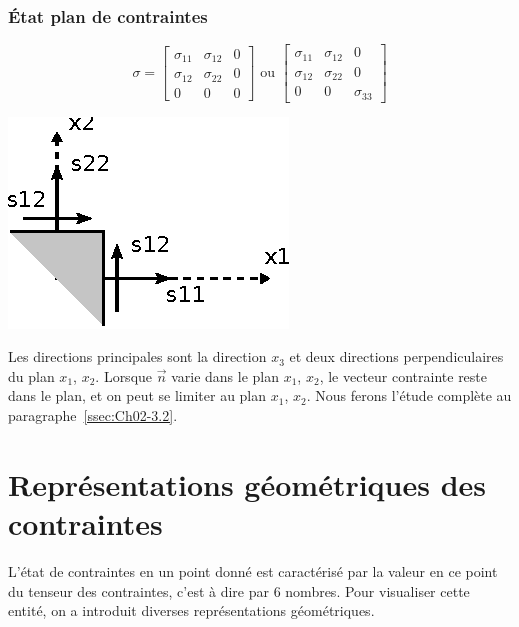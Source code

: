 \subsubsection{État plan de contraintes}
\begin{equation}
    \mathbb{\sigma} = 
    \begin{bmatrix}
        \sigma_{11} & \sigma_{12} & 0 \\
        \sigma_{12} & \sigma_{22} & 0 \\
        0 & 0 & 0
    \end{bmatrix}
    \text{ ou }
    \begin{bmatrix}
        \sigma_{11} & \sigma_{12} & 0 \\
        \sigma_{12} & \sigma_{22} & 0 \\
        0 & 0 & \sigma_{33}
    \end{bmatrix}
    \label{eq:Ch02-022}
\end{equation}
\begin{minipage}[l]{.3\textwidth}
    \begin{center}
        \includegraphics{../images/T1_Ch02-0010}
    \end{center}
\end{minipage}
\begin{minipage}[r]{.7\textwidth}
Les directions principales sont la direction $x_3$ et deux directions perpendiculaires du plan $x_1$, $x_2$.
Lorsque $\vec{n}$ varie dans le plan $x_1$, $x_2$, le vecteur contrainte reste dans le plan, et on peut se limiter au plan $x_1$, $x_2$.
Nous ferons l'étude complète au paragraphe~\ref{ssec:Ch02-3.2}.
\end{minipage}

\section{Représentations géométriques des contraintes} \label{sec:Ch02-2}
L'état de contraintes en un point donné est caractérisé par la valeur en ce point du tenseur des contraintes, c'est à dire par 6 nombres.
Pour visualiser cette entité, on a introduit diverses représentations géométriques.
